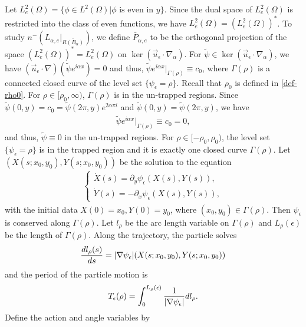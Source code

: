 \documentclass[1 [leqno, 11pt]{amsart}
\numberwithin{equation}{section}
\let\ep=\epsilon
\begin{document}
\begin{CJK*}{GBK}{song}
Let $ L_e^2(\Omega)=\{\phi\in L^2(\Omega)|\phi \text{ is even in } y\}$. Since the dual space of $ L_e^2(\Omega)$ is restricted into the class of even functions, we have $ L_e^2(\Omega)=(L_e^2(\Omega))^*$. To study $n^-\left(L_{\alpha,e}|_{\overline{R(B_\alpha)}} \right)$,  we define
$\bar{P}_{\alpha,e}$ to be the orthogonal   projection of the space $(L_e^2(\Omega))^*=L_e^2(\Omega)$ on $\ker(\vec{u}_\ep\cdot\nabla_\alpha)$. For $\widetilde{\psi}\in\ker(\vec{u}_\ep\cdot\nabla_\alpha)$, we have
$(\vec{u}_\ep\cdot\nabla)(\widetilde{\psi}e^{i\alpha x})=0$ and thus, $\widetilde{\psi}e^{i\alpha x}|_{\Gamma(\rho)}\equiv c_0$, where $\Gamma(\rho)$ is a connected closed curve of the level set $\{\psi_\ep=\rho\}$.  Recall that $\rho_0$ is defined in \eqref{def-rho0}.
For
$\rho\in[\rho_0,\infty)$, $\Gamma(\rho)$ is in the un-trapped regions. Since  $\widetilde{\psi}(0,y)=c_0=\widetilde{\psi}(2\pi,y)e^{2\alpha\pi i  }$ and $\widetilde{\psi}(0,y)=\widetilde{\psi}(2\pi,y)$, we have
\begin{align}\label{untrapped region-tilde-psi-e-ialphax}
\widetilde{\psi}e^{i\alpha x}|_{\Gamma(\rho)}\equiv c_0=0,
\end{align}
 and thus, $\widetilde{\psi}\equiv0$ in  the un-trapped regions.
For
$\rho\in[-\rho_0,\rho_0)$,  the level set $\{\psi_\ep=\rho\}$ is in the trapped region and it is exactly  one closed  curve $\Gamma(\rho)$.
Let $(X(s;x_0,y_0), Y(s;x_0,y_0))$ be the solution to the equation
\begin{align}\label{characteristic equation}
\begin{cases}
\dot{X}(s)=\partial_y\psi_\ep(X(s), Y(s)),\\
\dot{Y}(s)=-\partial_x\psi_\ep(X(s), Y(s)),
\end{cases}
\end{align}
with the initial data $X(0)=x_0,Y(0)=y_0$, where $(x_0,y_0)\in\Gamma(\rho)$. Then $\psi_{\ep}$ is conserved  along $\Gamma(\rho)$.
Let  $l_\rho$ be the arc length variable on $\Gamma(\rho)$
and $L_\rho(\ep)$ be the length of  $\Gamma(\rho)$.
 Along the trajectory, the particle solves
\begin{align*}
{d l_\rho(s)\over ds}=|\nabla\psi_\ep |(X(s;x_0,y_0),Y(s;x_0,y_0))
\end{align*}
 and the period of the particle motion is
\begin{align*}
T_\ep(\rho)=\int_0^{L_\rho(\ep)}{1\over|\nabla\psi_\ep|}dl_\rho.
\end{align*}
Define the action and angle variables by
\begin{align*}

\end{align*}
\end{CJK*}
\end{document}
